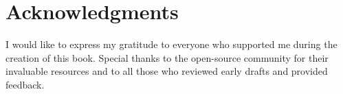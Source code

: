 \chapter{Acknowledgments}
I would like to express my gratitude to everyone who supported me during the creation of this book. Special thanks to the open-source community for their invaluable resources and to all those who reviewed early drafts and provided feedback.
